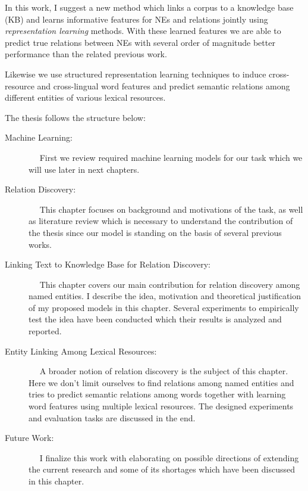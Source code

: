 In this work, I suggest a new method which links a corpus to a knowledge base
(KB) and learns informative features for NEs and relations jointly using
\emph{representation learning} methods. With these learned features we are able
to predict true relations between NEs with several order of magnitude better
performance than the related previous work.

Likewise we use structured representation learning techniques to induce
cross-resource and cross-lingual word features and predict semantic relations
among different entities of various lexical resources.

The thesis follows the structure below:
\begin{description}
\item[Machine Learning:]~~ First we review required machine learning models for
our task which we will use later in next chapters.

\item[Relation Discovery:]~~ This chapter focuses on background and
motivations of the task, as well as literature review which is necessary to understand the
contribution of the thesis since our model is standing on the basis of several
previous works.

\item[Linking Text to Knowledge Base for Relation Discovery:]~~ This chapter
covers our main contribution for relation discovery among named entities. I
describe the idea, motivation and theoretical justification of my proposed
models in this chapter. Several experiments to empirically test the idea have
been conducted which their results is analyzed and reported.

\item[Entity Linking Among Lexical Resources:]~~ A broader notion of relation
discovery is the subject of this chapter. Here we don't limit ourselves to find
relations among named entities and tries to predict semantic relations among
words together with learning word features using multiple lexical resources. The
designed experiments and evaluation tasks are discussed in the end.

\item[Future Work:]~~ I finalize this work with elaborating on possible
directions of extending the current research and some of its shortages which
have been discussed in this chapter.

\end{description}

